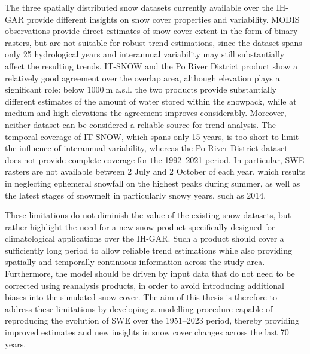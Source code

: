 The three spatially distributed snow datasets currently available over the IH-GAR provide different insights on snow cover properties and variability. 
MODIS observations provide direct estimates of snow cover extent in the form of binary rasters, but are not suitable for robust trend estimations, since 
the dataset spans only 25 hydrological years and interannual variability may still substantially affect the resulting trends. IT-SNOW and the Po River District 
product show a relatively good agreement over the overlap area, although elevation plays a significant role: below  $\SI{1000}{\meter}$ a.s.l. the 
two products provide substantially different estimates of the amount of water stored within the snowpack, while at medium and high elevations the 
agreement improves considerably. Moreover, neither dataset can be considered a reliable source for trend analysis. The temporal coverage of 
IT-SNOW, which spans only 15 years, is too short to limit the influence of interannual variability, whereas the Po River District dataset does not 
provide complete coverage for the 1992--2021 period. In particular, SWE rasters are not available between 2 July and 2 October of each year, which 
results in neglecting ephemeral snowfall on the highest peaks during summer, as well as the latest stages of snowmelt in particularly snowy years, such as 
2014. 

These limitations do not diminish the value of the existing snow datasets, but rather highlight the need for a new snow product specifically designed for 
climatological applications over the IH-GAR. Such a product should cover a sufficiently long period to allow reliable trend estimations while also 
providing spatially and temporally continuous information across the study area. Furthermore, the model should be driven by input data that do not need to 
be corrected using reanalysis products, in order to avoid introducing additional biases into the simulated snow cover. The aim of this thesis is therefore 
to address these limitations by developing a modelling procedure capable of reproducing the evolution of SWE over the 1951--2023 period, thereby 
providing improved estimates and new insights in snow cover changes across the last \num{70} years.

